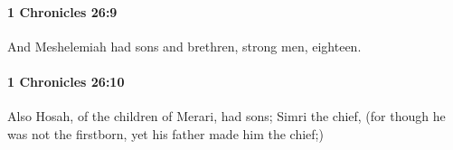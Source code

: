 		\paragraph{1 Chronicles 26:9} %
			\label{1CHRONICLES-26-9}

			And Meshelemiah had sons and brethren, strong men, eighteen.


		\paragraph{1 Chronicles 26:10} %
			\label{1CHRONICLES-26-10}

			Also Hosah, of the children of Merari, had sons; Simri the chief, (for though he was not the firstborn, yet his father made him the chief;)


